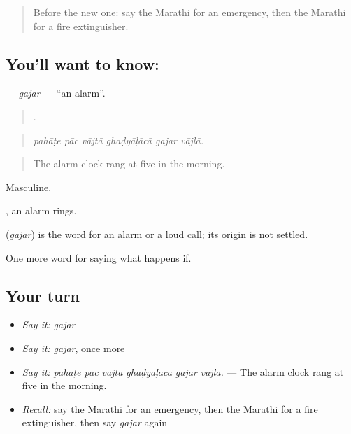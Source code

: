 \label{lesson:MR-C547-gajar-alarm}



\begin{quote}
Before the new one: say the Marathi for an emergency, then the Marathi for a fire extinguisher.
\end{quote}

\subsection*{You'll want to know: }
\textbf{} — \emph{gajar} — \textquotedblleft{}an alarm\textquotedblright{}.

\begin{quote}
     .
\end{quote}

\begin{quote}
\emph{pahāṭe pāc vājtā ghaḍyāḷācā gajar vājlā.}
\end{quote}

\begin{quote}
The alarm clock rang at five in the morning.
\end{quote}

Masculine.

 , an alarm rings.

\begin{cousinweb}
\textbf{} (\emph{gajar}) is the word for an alarm or a loud call; its origin is not settled.
\end{cousinweb}

\begin{grammarlens}[title={What you've built}]
One more word for saying what happens if.
\end{grammarlens}

\subsection*{Your turn}
\begin{itemize}
\raggedright
  \item \emph{Say it:} \emph{gajar}
  \item \emph{Say it:} \emph{gajar}, once more
  \item \emph{Say it:} \emph{pahāṭe pāc vājtā ghaḍyāḷācā gajar vājlā.} — The alarm clock rang at five in the morning.
  \item \emph{Recall:} say the Marathi for an emergency, then the Marathi for a fire extinguisher, then say \emph{gajar} again
\end{itemize}

